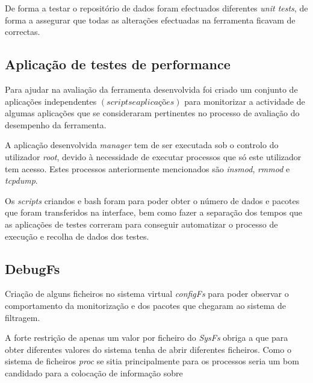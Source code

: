 De forma a testar o repositório de dados foram efectuados diferentes
\textit{unit tests}, de forma a assegurar que todas as alterações efectuadas na
ferramenta ficavam de correctas.

\subsection{Aplicação de testes de performance}

Para ajudar na avaliação da ferramenta desenvolvida foi criado um conjunto de
aplicações independentes $\left( scripts e aplicações \right)$ para monitorizar
a actividade de algumas aplicações que se consideraram pertinentes no processo
de avaliação do desempenho da ferramenta.

A aplicação desenvolvida \textit{manager} tem de ser executada sob o controlo
do utilizador \textit{root}, devido à necessidade de executar processos que só
este utilizador tem acesso. Estes processos anteriormente mencionados são
\textit{insmod}, \textit{rmmod} e \textit{tcpdump}.

Os \textit{scripts} criandos e bash foram para poder obter o número de dados e
pacotes que foram transferidos na interface, bem como fazer a separação dos
tempos que as aplicações de testes correram para conseguir automatizar o
processo de execução e recolha de dados dos testes.

\subsection{DebugFs}

Criação de alguns ficheiros no sistema virtual \textit{configFs} para poder
observar o comportamento da monitorização e dos pacotes que chegaram ao sistema
de filtragem.

A forte restrição de apenas um valor por ficheiro do \textit{SysFs} obriga a
que para obter diferentes valores do sistema tenha de abrir diferentes
ficheiros. Como o sistema de ficheiros \textit{proc} se sitia principalmente
para os processos seria um bom candidado para a colocação de informação sobre 